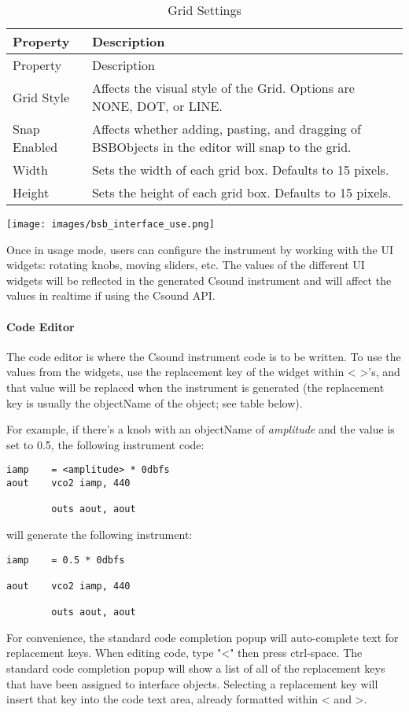 \begin{longtable}[]{@{}ll@{}}
\caption{Grid Settings}\tabularnewline
\toprule
Property & Description\tabularnewline
\midrule
\endfirsthead
\toprule
Property & Description\tabularnewline
\midrule
\endhead
Grid Style & Affects the visual style of the Grid. Options are NONE,
DOT, or LINE.\tabularnewline
Snap Enabled & Affects whether adding, pasting, and dragging of
BSBObjects in the editor will snap to the grid.\tabularnewline
Width & Sets the width of each grid box. Defaults to 15
pixels.\tabularnewline
Height & Sets the height of each grid box. Defaults to 15
pixels.\tabularnewline
\bottomrule
\end{longtable}

\texttt{[image: images/bsb\_interface\_use.png]}

Once in usage mode, users can configure the instrument by working with
the UI widgets: rotating knobs, moving sliders, etc. The values of the
different UI widgets will be reflected in the generated Csound
instrument and will affect the values in realtime if using the Csound
API.

\paragraph{Code Editor}

The code editor is where the Csound instrument code is to be written. To
use the values from the widgets, use the replacement key of the widget
within \textless{} \textgreater{}'s, and that value will be replaced
when the instrument is generated (the replacement key is usually the
objectName of the object; see table below).

For example, if there's a knob with an objectName of \emph{amplitude}
and the value is set to 0.5, the following instrument code:

\begin{verbatim}
iamp    = <amplitude> * 0dbfs
aout    vco2 iamp, 440

        outs aout, aout
\end{verbatim}

will generate the following instrument:

\begin{verbatim}
iamp    = 0.5 * 0dbfs

aout    vco2 iamp, 440

        outs aout, aout
\end{verbatim}

For convenience, the standard code completion popup will auto-complete
text for replacement keys. When editing code, type "\textless{}" then
press ctrl-space. The standard code completion popup will show a list of
all of the replacement keys that have been assigned to interface
objects. Selecting a replacement key will insert that key into the code
text area, already formatted within \textless{} and \textgreater{}.


